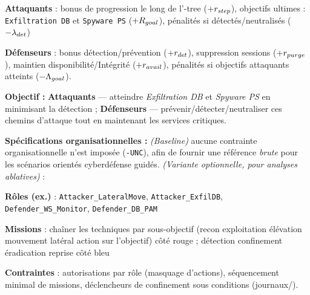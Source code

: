 \begin{enumerate*}[label={\roman*)}, itemjoin={; \quad}]
  \begin{enumerate*}[label={\alph*)}, itemjoin={; \ }]
    \item \textbf{Attaquants} : bonus de progression le long de l’-tree ($+r_{\small step}$), objectifs ultimes : \texttt{Exfiltration DB} et \texttt{Spyware PS} ($+R_{\small goal}$), pénalités si détectés/neutralisés ($-\lambda_{\small det}$)
    \item \textbf{Défenseurs} : bonus détection/prévention ($+r_{\small det}$), suppression sessions ($+r_{\small purge}$), maintien disponibilité/Intégrité ($+r_{\small avail}$), pénalités si objectifs attaquants atteints ($-\Lambda_{\small goal}$).
  \end{enumerate*}
  \item \textbf{Objectif :} \textbf{Attaquants} — atteindre \emph{Exfiltration DB} et \emph{Spyware PS} en minimisant la détection ; \textbf{Défenseurs} — prévenir/détecter/neutraliser ces chemins d’attaque tout en maintenant les services critiques.
\end{enumerate*}

\medskip
\textbf{Spécifications organisationnelles :} \emph{(Baseline)} aucune contrainte organisationnelle n’est imposée (\texttt{-UNC}), afin de fournir une référence \emph{brute} pour les scénarios orientés cyberdéfense guidés. \emph{(Variante optionnelle, pour analyses ablatives)} :
\begin{enumerate*}[label={\roman*)}, itemjoin={; \quad}]
  \item \textbf{Rôles (ex.)} : \texttt{Attacker\_LateralMove}, \texttt{Attacker\_ExfilDB}, \texttt{Defender\_WS\_Monitor}, \texttt{Defender\_DB\_PAM}
  \item \textbf{Missions} : chaîner les techniques  par sous-objectif (recon \textrightarrow{} exploitation \textrightarrow{} élévation \textrightarrow{} mouvement latéral \textrightarrow{} action sur l’objectif) côté rouge ; détection \textrightarrow{} confinement \textrightarrow{} éradication \textrightarrow{} reprise côté bleu
  \item \textbf{Contraintes} : autorisations par rôle (masquage d’actions), séquencement minimal de missions, déclencheurs de confinement sous conditions (journaux/).
\end{enumerate*}

